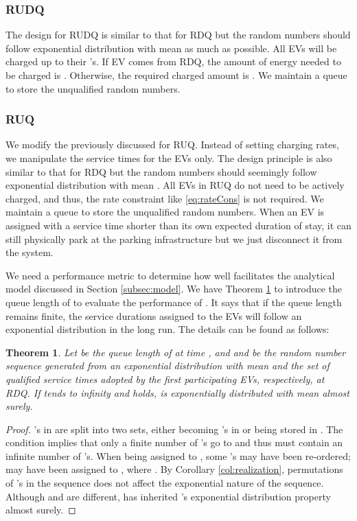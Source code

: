 \documentclass[journal]{IEEEtran}
\newtheorem{theorem}{\textbf{Theorem}}
\begin{document}
\subsubsection{RUDQ}
The  design for RUDQ is similar to that for RDQ but the random numbers should follow exponential distribution with mean  as much as possible. All EVs will be charged up to their 's. If EV  comes from RDQ,  the amount of energy needed to be charged is . Otherwise, the required charged amount is .  We maintain a queue  to store the unqualified random numbers.

\subsubsection{RUQ}
We modify the previously discussed  for RUQ. Instead of setting charging rates, we manipulate the service times for the EVs only. The design principle  is also similar to that for RDQ but the random numbers should seemingly follow exponential distribution with mean . All EVs in RUQ do not need to be actively charged, and thus, the rate constraint like \eqref{eq:rateCons} is not required. We maintain a queue  to store the unqualified random numbers. 
When an EV is assigned with a service time shorter than its own expected duration of stay, it can still physically park at the parking infrastructure but we just disconnect it from the system. 

We need a performance metric to determine how well  facilitates the analytical model discussed in Section \ref{subsec:model}. We have Theorem \ref{thmresult} to introduce the queue length of  to evaluate the performance of . It says that if the queue length remains finite, the service durations assigned to the EVs will follow an exponential distribution in the long run. The details can be found as follows:
\begin{theorem} \label{thmresult}
Let  be the queue length of  at time , and  and  be the random number sequence generated from an exponential distribution with mean  and the set of qualified service times adopted by the first  participating EVs, respectively, at RDQ.
 If  tends to infinity and 
holds,  is exponentially distributed with mean  almost surely.
\end{theorem}
\begin{proof}
's in  are split into two sets, either becoming 's in  or being stored in .
The condition  implies that only a finite number of 's go to  and thus  must contain an infinite number of 's. When being assigned to , some 's may have been re-ordered;   may have been assigned to , where . By Corollary  \ref{col:realization}, permutations of 's in the sequence does not affect the exponential nature of the sequence. Although  and  are different,  has inherited 's exponential distribution property almost surely.
\end{proof}
\end{document}
